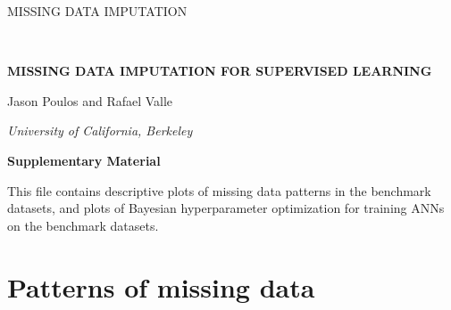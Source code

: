 \documentclass[10pt]{book}
\theoremstyle{definition}
\begin{document}

\renewcommand{\baselinestretch}{2}


{\hfill {\footnotesize\rm MISSING DATA IMPUTATION} \hfill}

\renewcommand{\thefootnote}{}
$\ $\par \fontsize{12}{14pt plus.8pt minus .6pt}\selectfont


 \centerline{\large\bf MISSING DATA IMPUTATION FOR SUPERVISED LEARNING}
\vspace{.25cm}
 \centerline{Jason Poulos and Rafael Valle} \vspace{.4cm} 
\vspace{.4cm}
 \centerline{\it University of California, Berkeley}
\vspace{.55cm}
 \centerline{\bf Supplementary Material}
\vspace{.55cm}
\fontsize{9}{11.5pt plus.8pt minus .6pt}\selectfont
\noindent
This file contains descriptive plots of missing data patterns in the benchmark datasets, and plots of Bayesian hyperparameter optimization for training ANNs on the benchmark datasets.
\par

\setcounter{section}{0}
\setcounter{equation}{0}
\def\theequation{S\arabic{section}.\arabic{equation}}
\def\thesection{S\arabic{section}}

\fontsize{12}{14pt plus.8pt minus .6pt}\selectfont

\section{Patterns of missing data}
\end{document}
